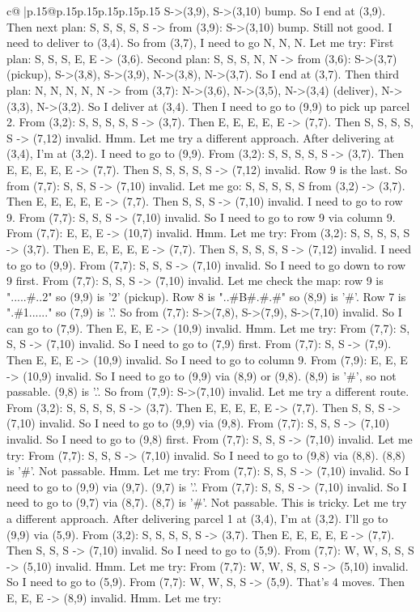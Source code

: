 \documentclass{article}
\begin{document}
{\begin{supertabular}{c@{$\;$}|p{.15\linewidth}@{}p{.15\linewidth}p{.15\linewidth}p{.15\linewidth}p{.15\linewidth}p{.15\linewidth}}
{{{S{-}>(3,9), S{-}>(3,10) bump. So I end at (3,9). Then next plan: S, S, S, S, S {-}> from (3,9): S{-}>(3,10) bump. Still not good. I need to deliver to (3,4). So from (3,7), I need to go N, N, N. Let me try: First plan: S, S, S, E, E {-}> (3,6). Second plan: S, S, S, N, N {-}> from (3,6): S{-}>(3,7) (pickup), S{-}>(3,8), S{-}>(3,9), N{-}>(3,8), N{-}>(3,7). So I end at (3,7). Then third plan: N, N, N, N, N {-}> from (3,7): N{-}>(3,6), N{-}>(3,5), N{-}>(3,4) (deliver), N{-}>(3,3), N{-}>(3,2). So I deliver at (3,4). Then I need to go to (9,9) to pick up parcel 2. From (3,2): S, S, S, S, S {-}> (3,7). Then E, E, E, E, E {-}> (7,7). Then S, S, S, S, S {-}> (7,12) invalid. Hmm. Let me try a different approach. After delivering at (3,4), I'm at (3,2). I need to go to (9,9). From (3,2): S, S, S, S, S {-}> (3,7). Then E, E, E, E, E {-}> (7,7). Then S, S, S, S, S {-}> (7,12) invalid. Row 9 is the last. So from (7,7): S, S, S {-}> (7,10) invalid. Let me go: S, S, S, S, S from (3,2) {-}> (3,7). Then E, E, E, E, E {-}> (7,7). Then S, S, S {-}> (7,10) invalid. I need to go to row 9. From (7,7): S, S, S {-}> (7,10) invalid. So I need to go to row 9 via column 9. From (7,7): E, E, E {-}> (10,7) invalid. Hmm. Let me try: From (3,2): S, S, S, S, S {-}> (3,7). Then E, E, E, E, E {-}> (7,7). Then S, S, S, S, S {-}> (7,12) invalid. I need to go to (9,9). From (7,7): S, S, S {-}> (7,10) invalid. So I need to go down to row 9 first. From (7,7): S, S, S {-}> (7,10) invalid. Let me check the map: row 9 is ".....\#..2" so (9,9) is '2' (pickup). Row 8 is "..\#B\#.\#.\#" so (8,9) is '\#'. Row 7 is ".\#1......" so (7,9) is '.'. So from (7,7): S{-}>(7,8), S{-}>(7,9), S{-}>(7,10) invalid. So I can go to (7,9). Then E, E, E {-}> (10,9) invalid. Hmm. Let me try: From (7,7): S, S, S {-}> (7,10) invalid. So I need to go to (7,9) first. From (7,7): S, S {-}> (7,9). Then E, E, E {-}> (10,9) invalid. So I need to go to column 9. From (7,9): E, E, E {-}> (10,9) invalid. So I need to go to (9,9) via (8,9) or (9,8). (8,9) is '\#', so not passable. (9,8) is '.'. So from (7,9): S{-}>(7,10) invalid. Let me try a different route. From (3,2): S, S, S, S, S {-}> (3,7). Then E, E, E, E, E {-}> (7,7). Then S, S, S {-}> (7,10) invalid. So I need to go to (9,9) via (9,8). From (7,7): S, S, S {-}> (7,10) invalid. So I need to go to (9,8) first. From (7,7): S, S, S {-}> (7,10) invalid. Let me try: From (7,7): S, S, S {-}> (7,10) invalid. So I need to go to (9,8) via (8,8). (8,8) is '\#'. Not passable. Hmm. Let me try: From (7,7): S, S, S {-}> (7,10) invalid. So I need to go to (9,9) via (9,7). (9,7) is '.'. From (7,7): S, S, S {-}> (7,10) invalid. So I need to go to (9,7) via (8,7). (8,7) is '\#'. Not passable. This is tricky. Let me try a different approach. After delivering parcel 1 at (3,4), I'm at (3,2). I'll go to (9,9) via (5,9). From (3,2): S, S, S, S, S {-}> (3,7). Then E, E, E, E, E {-}> (7,7). Then S, S, S {-}> (7,10) invalid. So I need to go to (5,9). From (7,7): W, W, S, S, S {-}> (5,10) invalid. Hmm. Let me try: From (7,7): W, W, S, S, S {-}> (5,10) invalid. So I need to go to (5,9). From (7,7): W, W, S, S {-}> (5,9). That's 4 moves. Then E, E, E {-}> (8,9) invalid. Hmm. Let me try: }}}
\end{supertabular}}
\end{document}
